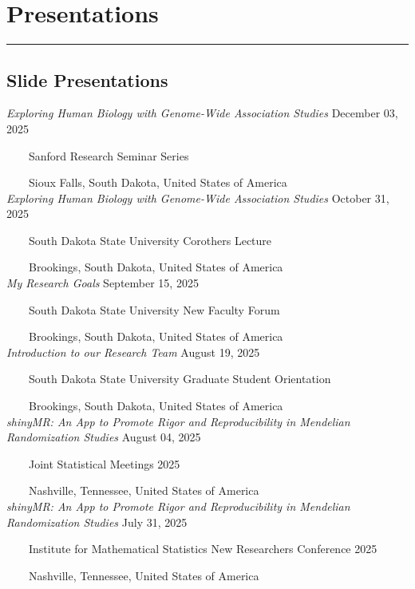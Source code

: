 \documentclass[
  10pt,
]
{article}
\begin{document}
\section{Presentations}\label{presentations}

\hrule

\subsection{Slide Presentations}\label{slide-presentations}

\normalsize \textit{Exploring Human Biology with Genome-Wide Association Studies}
\hfill December 03, 2025\\
\strut ~~~~Sanford Research Seminar Series\\
\strut ~~~~Sioux Falls, South Dakota, United States of America\\
\normalsize \textit{Exploring Human Biology with Genome-Wide Association Studies}
\hfill October 31, 2025\\
\strut ~~~~South Dakota State University Corothers Lecture\\
\strut ~~~~Brookings, South Dakota, United States of America\\
\normalsize \textit{My Research Goals} \hfill September 15, 2025\\
\strut ~~~~South Dakota State University New Faculty Forum\\
\strut ~~~~Brookings, South Dakota, United States of America\\
\normalsize \textit{Introduction to our Research Team} \hfill August 19,
2025\\
\strut ~~~~South Dakota State University Graduate Student Orientation\\
\strut ~~~~Brookings, South Dakota, United States of America\\
\normalsize \textit{shinyMR: An App to Promote Rigor and Reproducibility in Mendelian Randomization Studies}
\hfill August 04, 2025\\
\strut ~~~~Joint Statistical Meetings 2025\\
\strut ~~~~Nashville, Tennessee, United States of America\\
\normalsize \textit{shinyMR: An App to Promote Rigor and Reproducibility in Mendelian Randomization Studies}
\hfill July 31, 2025\\
\strut ~~~~Institute for Mathematical Statistics New Researchers
Conference 2025\\
\strut ~~~~Nashville, Tennessee, United States of America\\
\end{document}
